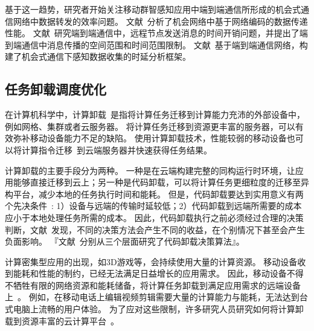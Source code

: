 基于这一趋势，研究者开始关注移动群智感知应用中端到端通信所形成的机会式通信网络中数据转发的效率问题。
文献~\cite{DBLP:conf/wcnc/QinF13}分析了机会网络中基于网络编码的数据传递性能。
文献~\cite{DBLP:journals/twc/LiW14}研究端到端通信中，远程节点发送消息的时间开销问题，并提出了端到端通信中消息传播的空间范围和时间范围限制。
文献~\cite{DBLP:journals/winet/ZhaoMLT18}基于端到端通信网络，构建了机会式通信下感知数据收集的时延分析框架。

\subsection{任务卸载调度优化}

在计算机科学中，计算卸载~\cite{DBLP:journals/network/MaZZWP13}是指将计算任务迁移到计算能力充沛的外部设备中，例如网格、集群或者云服务器。
将计算任务迁移到资源更丰富的服务器，可以有效弥补移动设备能力不足的缺陷。
使用计算卸载技术，性能较弱的移动设备也可以将计算指令迁移~\cite{DBLP:journals/monet/KumarLLB13}到云端服务器并快速获得任务结果。

计算卸载的主要手段分为两种。
一种是在云端构建完整的同构运行时环境，让应用能够直接迁移到云上；另一种是代码卸载，可以将计算任务更细粒度的迁移至异构平台，减少本地的任务执行时间和能耗。
但是，代码卸载要达到实用意义有两个先决条件~\cite{Flores:2017bv}: 1）设备与远端的传输时延较低；2）代码卸载到远端所需要的成本应小于本地处理任务所需的成本。
因此，代码卸载执行之前必须经过合理的决策判断，文献~\cite{Kosta:2012cj}发现，不同的决策方法会产生不同的收益，在个别情况下甚至会产生负面影响。
『文献~\cite{Chen:2016bd,Baier:2012hb,Han:2012dl}分别从三个层面研究了代码卸载决策算法』。

计算密集型应用的出现，如3D游戏等，会持续使用大量的计算资源。
移动设备收到能耗和性能的制约，已经无法满足日益增长的应用需求。
因此，移动设备不得不牺牲有限的网络资源和能耗储备，将计算任务卸载到满足应用需求的远端设备上~\cite{DBLP:conf/ispa/KovachevYK12}。
例如，在移动电话上编辑视频剪辑需要大量的计算能力与能耗，无法达到台式电脑上流畅的用户体验。
为了应对这些限制，许多研究人员研究如何将计算卸载到资源丰富的云计算平台~\cite{DBLP:conf/secon/HassanXWC15,DBLP:journals/pervasive/SatyanarayananBCD09,DBLP:journals/computer/KumarL10}。

